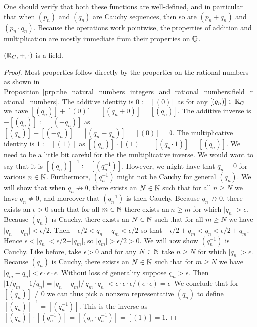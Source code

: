 \documentclass[../main.tex]{subfiles}
\begin{document}
One should verify that both these functions are well-defined, and in particular that when $(p_n)$ and $(q_n)$ are Cauchy sequences, then so are $(p_n+q_n)$ and $(p_n\cdot q_n)$. Because the operations work pointwise, the properties of addition and multiplication are mostly immediate from their properties on $\mathbb{Q}$.
\begin{proposition}\label{prp:the_real_numbers:cantor_field_real_numbers}
    $(\mathbb{R}_C,+,\cdot)$ is a field.
\end{proposition}
\begin{proof}
    Most properties follow directly by the properties on the rational numbers as shown in Proposition~\ref{prp:the_natural_numbers_integers_and_rational_numbers:field_rational_numbers}. The additive identity is $0:=[(0)]$ as for any $[(q_n)]\in\mathbb{R}_C$ we have $[(q_n)]+[(0)]=[(q_n+0)]=[(q_n)]$. The additive inverse is $-[(q_n)]:=[(-q_n)]$ as $[(q_n)]+[(-q_n)]=[(q_n-q_n)]=[(0)]=0$. The multiplicative identity is $1:=[(1)]$ as $[(q_n)]\cdot[(1)]=[(q_n\cdot1)]=[(q_n)]$. We need to be a little bit careful for the the multiplicative inverse. We would want to say that it is $[(q_n)]^{-1}:=[(q_n^{-1})]$. However, we might have that $q_n=0$ for various $n\in\mathbb{N}$. Furthermore, $(q_n^{-1})$ might not be Cauchy for general $(q_n)$. We will show that when $q_n\not\to0$, there exists an $N\in\mathbb{N}$ such that for all $n\geq N$ we have $q_n\neq0$, and moreover that $(q_n^{-1})$ is then Cauchy. Because $q_n\not\to0$, there exists an $\epsilon>0$ such that for all $m\in\mathbb{N}$ there exists an $n\geq m$ for which $\vert q_n\vert>\epsilon$. Because $(q_n)$ is Cauchy, there exists an $N\in\mathbb{N}$ such that for all $m\geq N$ we have $\vert q_n-q_m\vert<\epsilon/2$. Then $-\epsilon/2<q_n-q_m<\epsilon/2$ so that $-\epsilon/2+q_m<q_n<\epsilon/2+q_m$. Hence $\epsilon<\vert q_n\vert<\epsilon/2+\vert q_m\vert$, so $\vert q_m\vert>\epsilon/2>0$. We will now show $(q_n^{-1})$ is Cauchy. Like before, take $\epsilon>0$ and for any $N\in\mathbb{N}$ take $n\geq N$ for which $\vert q_n\vert>\epsilon$. Because $(q_n)$ is Cauchy, there exists an $N\in\mathbb{N}$ such that for $m\geq N$ we have $\vert q_m-q_n\vert<\epsilon\cdot\epsilon\cdot\epsilon$. Without loss of generality suppose $q_m>\epsilon$. Then $\vert1/q_m-1/q_n\vert=\vert q_n-q_m\vert/\vert q_m\cdot q_n\vert<\epsilon\cdot\epsilon\cdot\epsilon/(\epsilon\cdot\epsilon)=\epsilon$. We conclude that for $[(q_n)]\neq0$ we can thus pick a nonzero representative $(q_n)$ to define $[(q_n)]^{-1}=[(q_n^{-1})]$. This is the inverse as $[(q_n)]\cdot[(q_n^{-1})]=[(q_n\cdot q_n^{-1})]=[(1)]=1$.
\end{proof}
\end{document}
